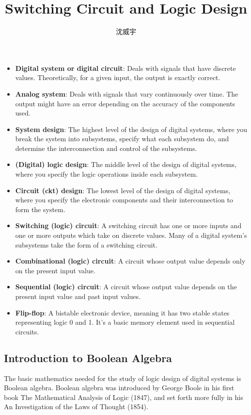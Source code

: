 \documentclass[a4paper,12pt]{article}
\begin{document}
\title{Switching Circuit and Logic Design}
\author{沈威宇}
\date{\temtoday}
\titletocdoc
{}
\begin{itemize}
\item\textbf{Digital system or digital circuit}: Deals with signals that have discrete values. Theoretically, for a given input, the output is exactly correct.
\item\textbf{Analog system}: Deals with signals that vary continuously over time. The output might have an error depending on the accuracy of the components used.
\item\textbf{System design}: The highest level of the design of digital systems, where you break the system into subsystems, specify what each subsystem do, and determine the interconnection and control of the subsystems.
\item\textbf{(Digital) logic design}: The middle level of the design of digital systems, where you specify the logic operations inside each subsystem.
\item\textbf{Circuit (ckt) design}: The lowest level of the design of digital systems, where you specify the electronic components and their interconnection to form the system.
\item\textbf{Switching (logic) circuit}: A switching circuit has one or more inputs and one or more outputs which take on discrete values. Many of a digital system's subsystems take the form of a switching circuit.
\item\textbf{Combinational (logic) circuit}: A circuit whose output value depends only on the present input value.
\item\textbf{Sequential (logic) circuit}: A circuit whose output value depends on the present input value and past input values.
\item\textbf{Flip-flop}: A bistable electronic device, meaning it has two stable states representing logic 0 and 1. It's a basic memory element used in sequential circuits.
\end{itemize}
\subsection{Introduction to Boolean Algebra}
The basic mathematics needed for the study of logic design of digital systems is Boolean algebra. Boolean algebra was introduced by George Boole in his first book The Mathematical Analysis of Logic (1847), and set forth more fully in his An Investigation of the Laws of Thought (1854).
\end{document}

